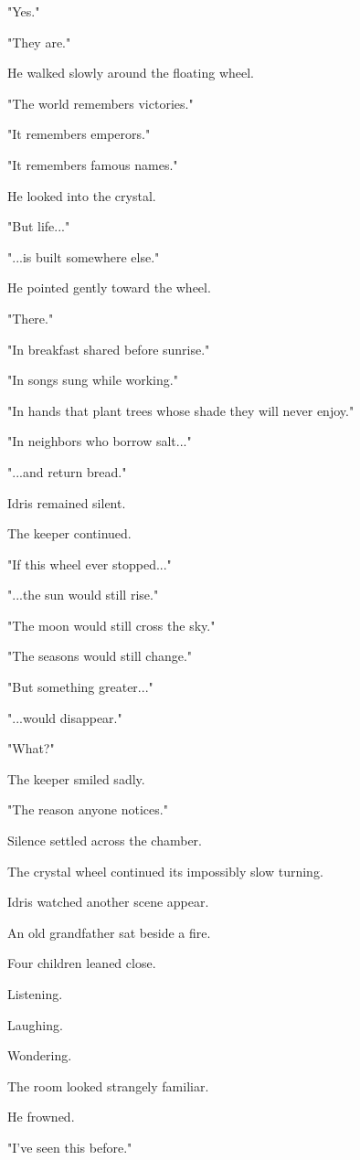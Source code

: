 \documentclass[12pt,openany]{book}
\begin{document}
"Yes."

"They are."

He walked slowly around the floating wheel.

"The world remembers victories."

"It remembers emperors."

"It remembers famous names."

He looked into the crystal.

"But life..."

"...is built somewhere else."

He pointed gently toward the wheel.

"There."

"In breakfast shared before sunrise."

"In songs sung while working."

"In hands that plant trees whose shade they will never enjoy."

"In neighbors who borrow salt..."

"...and return bread."

Idris remained silent.

The keeper continued.

"If this wheel ever stopped..."

"...the sun would still rise."

"The moon would still cross the sky."

"The seasons would still change."

"But something greater..."

"...would disappear."

"What?"

The keeper smiled sadly.

"The reason anyone notices."

Silence settled across the chamber.

The crystal wheel continued its impossibly slow turning.

Idris watched another scene appear.

An old grandfather sat beside a fire.

Four children leaned close.

Listening.

Laughing.

Wondering.

The room looked strangely familiar.

He frowned.

"I've seen this before."
\end{document}
